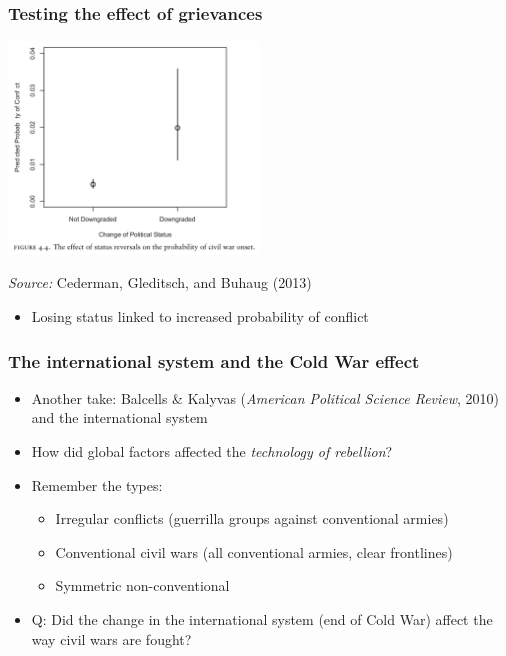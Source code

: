 \documentclass[utf8, xcolor=dvipsnames]{beamer}
\begin{document}
\begin{frame}
\frametitle{Testing the effect of grievances}
\centering

\includegraphics[width = 0.5\textwidth]{img/cgb_effect_downgrading}

\vspace{10pt}

{\small \textit{Source:} Cederman, Gleditsch, and Buhaug (2013)}

\vspace{15pt}

\begin{itemize}
  \item Losing status linked to increased probability of conflict
\end{itemize}

\end{frame}

\begin{frame}
\frametitle{The international system and the Cold War effect}
\centering

\begin{itemize}[<+->]
  \item Another take: Balcells \& Kalyvas (\textit{American Political Science Review}, 2010) and the international system
  \item How did global factors affected the \textit{technology of rebellion}?
  \item Remember the types:
  \begin{itemize}
    \item Irregular conflicts (guerrilla groups against conventional armies)
    \item Conventional civil wars (all conventional armies, clear frontlines)
    \item Symmetric non-conventional
  \end{itemize}
  \item Q: Did the change in the international system (end of Cold War) affect the way civil wars are fought?
\end{itemize}

\end{frame}
\end{document}
